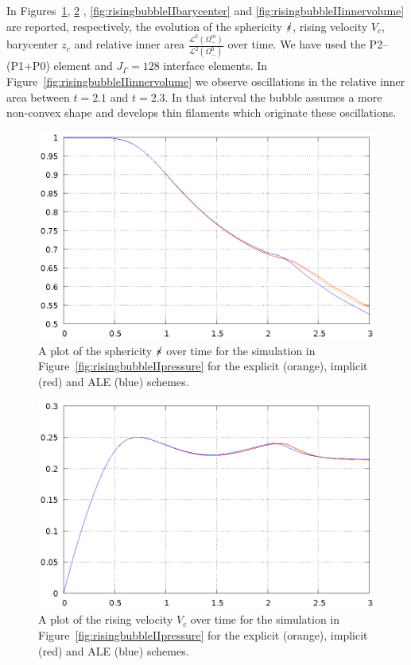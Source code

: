 In Figures~\ref{fig:risingbubbleIIsphericity},
\ref{fig:risingbubbleIIrisingvelocity} , \ref{fig:risingbubbleIIbarycenter} and
\ref{fig:risingbubbleIIinnervolume} are reported, respectively, the evolution of
the sphericity $\mbox{$s\!\!\!\!\:/$}$, rising velocity $V_c$, barycenter $z_c$ and relative
inner area $\frac{\mathcal{L}^2(\Omega^m_-)}{\mathcal{L}^2(\Omega^0_-)}$ over
time. We have used the P2--(P1+P0) element and $J_\Gamma=128$ interface
elements. In Figure~\ref{fig:risingbubbleIIinnervolume} we observe oscillations
in the relative inner area between $t=2.1$ and $t=2.3$. In that interval the
bubble assumes a more non-convex shape and develops thin filaments which
originate these oscillations.
\begin{figure}[htbp]
\centering
\includegraphics[width=.45\textwidth]
{figures/navier_stokes/rising_bubble_II_sphericity.ps}
\caption[Navier--Stokes rising bubble II sphericity]
{A plot of the sphericity $\mbox{$s\!\!\!\!\:/$}$ over time for the simulation in
Figure~\ref{fig:risingbubbleIIpressure} for the explicit (orange), implicit
(red) and ALE (blue) schemes.}
\label{fig:risingbubbleIIsphericity}
\end{figure}

\begin{figure}[htbp]
\centering
\includegraphics[width=.45\textwidth]
{figures/navier_stokes/rising_bubble_II_rising_velocity.ps}
\caption[Navier--Stokes rising bubble II rising velocity]
{A plot of the rising velocity $V_c$ over time for the simulation in
Figure~\ref{fig:risingbubbleIIpressure} for the explicit (orange), implicit
(red) and ALE (blue) schemes.}
\label{fig:risingbubbleIIrisingvelocity}
\end{figure}

